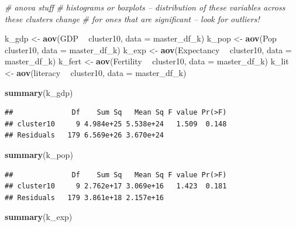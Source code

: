 \documentclass[]{article}
\newenvironment{Shaded}{\begin{snugshade}}{\end{snugshade}}
\newcommand{\CommentTok}[1]{\textcolor[rgb]{0.56,0.35,0.01}{\textit{#1}}}
\newcommand{\DataTypeTok}[1]{\textcolor[rgb]{0.13,0.29,0.53}{#1}}
\newcommand{\KeywordTok}[1]{\textcolor[rgb]{0.13,0.29,0.53}{\textbf{#1}}}
\newcommand{\NormalTok}[1]{#1}
\newcommand{\OperatorTok}[1]{\textcolor[rgb]{0.81,0.36,0.00}{\textbf{#1}}}
\newcommand{\StringTok}[1]{\textcolor[rgb]{0.31,0.60,0.02}{#1}}
\begin{document}
\begin{Shaded}
\begin{Highlighting}[]
\CommentTok{# anova stuff}
\CommentTok{# histograms or boxplots -- distribution of these variables across these clusters change}
\CommentTok{# for ones that are significant -- look for outliers!}

\NormalTok{k_gdp <-}\StringTok{ }\KeywordTok{aov}\NormalTok{(GDP }\OperatorTok{~}\StringTok{ }\NormalTok{cluster10, }\DataTypeTok{data =}\NormalTok{ master_df_k)}
\NormalTok{k_pop <-}\StringTok{ }\KeywordTok{aov}\NormalTok{(Pop }\OperatorTok{~}\StringTok{ }\NormalTok{cluster10, }\DataTypeTok{data =}\NormalTok{ master_df_k) }
\NormalTok{k_exp <-}\StringTok{ }\KeywordTok{aov}\NormalTok{(Expectancy }\OperatorTok{~}\StringTok{ }\NormalTok{cluster10, }\DataTypeTok{data =}\NormalTok{ master_df_k) }
\NormalTok{k_fert <-}\StringTok{ }\KeywordTok{aov}\NormalTok{(Fertility }\OperatorTok{~}\StringTok{ }\NormalTok{cluster10, }\DataTypeTok{data =}\NormalTok{ master_df_k) }
\NormalTok{k_lit <-}\StringTok{ }\KeywordTok{aov}\NormalTok{(literacy }\OperatorTok{~}\StringTok{ }\NormalTok{cluster10, }\DataTypeTok{data =}\NormalTok{ master_df_k) }

\KeywordTok{summary}\NormalTok{(k_gdp)}
\end{Highlighting}
\end{Shaded}

\begin{verbatim}
##              Df    Sum Sq   Mean Sq F value Pr(>F)
## cluster10     9 4.984e+25 5.538e+24   1.509  0.148
## Residuals   179 6.569e+26 3.670e+24
\end{verbatim}

\begin{Shaded}
\begin{Highlighting}[]
\KeywordTok{summary}\NormalTok{(k_pop)}
\end{Highlighting}
\end{Shaded}

\begin{verbatim}
##              Df    Sum Sq   Mean Sq F value Pr(>F)
## cluster10     9 2.762e+17 3.069e+16   1.423  0.181
## Residuals   179 3.861e+18 2.157e+16
\end{verbatim}

\begin{Shaded}
\begin{Highlighting}[]
\KeywordTok{summary}\NormalTok{(k_exp)}
\end{Highlighting}
\end{Shaded}
\end{document}
